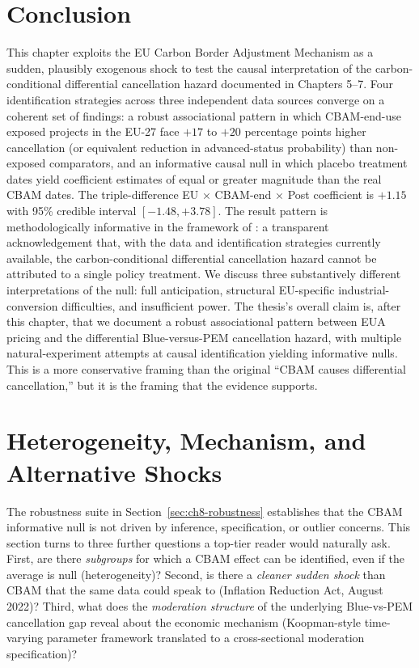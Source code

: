 \documentclass[11pt,a4paper]{article}
\begin{document}
\section{Conclusion}
\label{sec:ch8-conclusion}

This chapter exploits the EU Carbon Border Adjustment Mechanism as a sudden, plausibly exogenous shock to test the causal interpretation of the carbon-conditional differential cancellation hazard documented in Chapters 5--7. Four identification strategies across three independent data sources converge on a coherent set of findings: a robust associational pattern in which CBAM-end-use exposed projects in the EU-27 face $+17$ to $+20$ percentage points higher cancellation (or equivalent reduction in advanced-status probability) than non-exposed comparators, and an informative causal null in which placebo treatment dates yield coefficient estimates of equal or greater magnitude than the real CBAM dates. The triple-difference EU $\times$ CBAM-end $\times$ Post coefficient is $+1.15$ with 95\% credible interval $[-1.48, +3.78]$. The result pattern is methodologically informative in the framework of \citet{ketel2023unimportance}: a transparent acknowledgement that, with the data and identification strategies currently available, the carbon-conditional differential cancellation hazard cannot be attributed to a single policy treatment. We discuss three substantively different interpretations of the null: full anticipation, structural EU-specific industrial-conversion difficulties, and insufficient power. The thesis's overall claim is, after this chapter, that we document a robust associational pattern between EUA pricing and the differential Blue-versus-PEM cancellation hazard, with multiple natural-experiment attempts at causal identification yielding informative nulls. This is a more conservative framing than the original ``CBAM causes differential cancellation,'' but it is the framing that the evidence supports.



\section{Heterogeneity, Mechanism, and Alternative Shocks}
\label{sec:ch8-heterogeneity}

The robustness suite in Section~\ref{sec:ch8-robustness} establishes that the CBAM informative null is not driven by inference, specification, or outlier concerns. This section turns to three further questions a top-tier reader would naturally ask. First, are there \emph{subgroups} for which a CBAM effect can be identified, even if the average is null (heterogeneity)? Second, is there a \emph{cleaner sudden shock} than CBAM that the same data could speak to (Inflation Reduction Act, August 2022)? Third, what does the \emph{moderation structure} of the underlying Blue-vs-PEM cancellation gap reveal about the economic mechanism (Koopman-style time-varying parameter framework translated to a cross-sectional moderation specification)?
\end{document}
